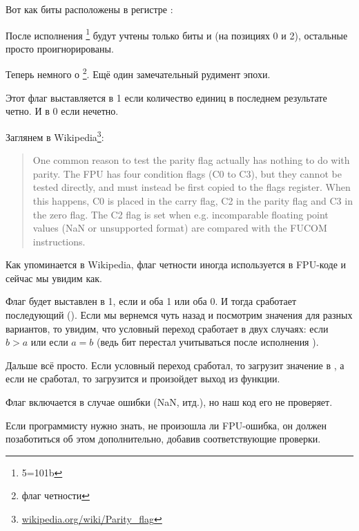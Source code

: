

Вот как биты \CThreeBits расположены в регистре \AH:



После исполнения \footnote{5=101b} %
будут учтены только биты \Czero и \Ctwo (на позициях 0 и 2), остальные просто проигнорированы.

\label{parity_flag}
Теперь немного о \footnote{флаг четности}. 
Ещё один замечательный рудимент эпохи.

Этот флаг выставляется в 1 если количество единиц в последнем результате четно. 
И в 0 если нечетно.

Заглянем в Wikipedia\footnote{\href{http://go.yurichev.com/17131}{wikipedia.org/wiki/Parity\_flag}}:

\begin{framed}
\begin{quotation}
One common reason to test the parity flag actually has nothing to do with parity. The FPU has four condition flags 
(C0 to C3), but they cannot be tested directly, and must instead be first copied to the flags register. 
When this happens, C0 is placed in the carry flag, C2 in the parity flag and C3 in the zero flag. 
The C2 flag is set when e.g. incomparable floating point values (NaN or unsupported format) are compared 
with the FUCOM instructions.
\end{quotation}
\end{framed}

Как упоминается в Wikipedia, флаг четности иногда используется в FPU-коде и сейчас мы увидим как.

Флаг \PF будет выставлен в 1, если \Czero и \Ctwo оба 1 или оба 0. 
И тогда сработает последующий \JP (). 
Если мы вернемся чуть назад и посмотрим значения \CThreeBits 
для разных вариантов, то увидим, что условный переход \JP сработает в двух случаях: если $b>a$ или если $a=b$ 
(ведь бит \Cthree перестал учитываться после исполнения ).

Дальше всё просто. Если условный переход сработал, то \FLD загрузит значение  в , 
а если не сработал, то загрузится  и произойдет выход из функции.


Флаг \Ctwo включается в случае ошибки (\gls{NaN}, итд.), но наш код его не проверяет.

Если программисту нужно знать, не произошла ли FPU-ошибка, он должен позаботиться об этом
дополнительно, добавив соответствующие проверки.


